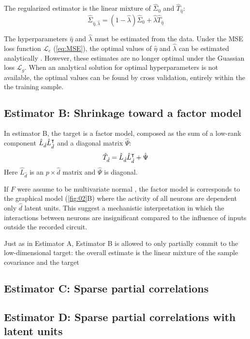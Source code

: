 The regularized estimator is the linear mixture of $\hat\Sigma_0$ and $\hat T_{\hat\eta}$:
\begin{equation}
\hat\Sigma_{\hat\eta,\hat\lambda} = (1-\hat\lambda)\hat\Sigma_0 + \hat\lambda \hat T_{\hat\eta} 
\end{equation}

The hyperparameters $\hat\eta$ and $\hat\lambda$ must be estimated from the data.  Under the MSE loss function $\mathcal L_e$ (\autoref{eq:MSE}), the optimal values of $\hat\eta$ and $\hat\lambda$ can be estimated analytically \citep{Ledoit:2004,Schafer:2005,Schaefer:2010}. However, these estimates are no longer optimal under the Guassian loss $\mathcal L_g$.   When an analytical solution for optimal hyperparameters is not available, the optimal values can be found by cross validation, entirely within the the training sample. 


\subsection{Estimator B: Shrinkage toward a factor model}
In estimator B, the target is a factor model, composed as the sum of a low-rank component $\hat L_{\hat d}\hat L_{\hat d}^\intercal$ and a diagonal matrix $\hat \Psi$:
\begin{equation}
\hat T_{\hat d} = \hat L_{\hat d} \hat L_{\hat d}^\intercal + \hat\Psi
\end{equation}
Here $\hat L_{\hat d}$ is an $p\times\hat d$ matrix and $\hat\Psi$ is diagonal.  

If $F$ were assume to be multivariate normal , the factor model is corresponds to the graphical model (\autoref{fig:02}B) where the activity of all neurons are dependent only $\hat d$ latent units. This suggest a mechanistic interpretation in which the interactions between neurons are insignificant compared to the influence of inputs outside the recorded circuit.

Just as in Estimator A, Estimator B is allowed to only partially commit to the low-dimensional target: the overall estimate is the linear mixture of the sample covariance and the target


\subsection{Estimator C: Sparse partial correlations}
\citep{Meinshausen:2006,Friedman:2008}

\subsection{Estimator D: Sparse partial correlations with latent units}
\citep{Ma:2013} 



